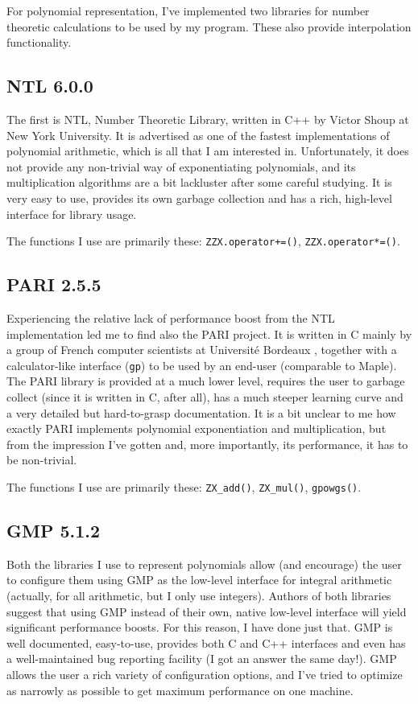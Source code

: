 \documentclass[a4paper, titlepage]{article}
\newcommand{\code}{\texttt}
\begin{document}
For polynomial representation, I've implemented two libraries for number theoretic calculations to be used by my program. These also provide interpolation functionality.

\subsection{NTL 6.0.0}
The first is NTL, Number Theoretic Library, written in C++ by Victor Shoup at New York University\cite{ntl}. It is advertised as one of the fastest implementations of polynomial arithmetic, which is all that I am interested in. Unfortunately, it does not provide any non-trivial way of exponentiating polynomials, and its multiplication algorithms are a bit lackluster after some careful studying. It is very easy to use, provides its own garbage collection and has a rich, high-level interface for library usage.

The functions I use are primarily these: \code{ZZX.operator+=()}, \code{ZZX.operator*=()}.

\subsection{PARI 2.5.5}
Experiencing the relative lack of performance boost from the NTL implementation led me to find also the PARI project. It is written in C mainly by a group of French computer scientists at Université Bordeaux \cite{pari}, together with a calculator-like interface (\code{gp}) to be used by an end-user (comparable to Maple). The PARI library is provided at a much lower level, requires the user to garbage collect (since it is written in C, after all), has a much steeper learning curve and a very detailed but hard-to-grasp documentation. It is a bit unclear to me how exactly PARI implements polynomial exponentiation and multiplication, but from the impression I've gotten and, more importantly, its performance, it has to be non-trivial.

The functions I use are primarily these: \code{ZX\_add()}, \code{ZX\_mul()}, \code{gpowgs()}.

\subsection{GMP 5.1.2}
Both the libraries I use to represent polynomials allow (and encourage) the user to configure them using GMP\cite{gmp} as the low-level interface for integral arithmetic (actually, for all arithmetic, but I only use integers). Authors of both libraries suggest that using GMP instead of their own, native low-level interface will yield significant performance boosts. For this reason, I have done just that. GMP is well documented, easy-to-use, provides both C and C++ interfaces and even has a well-maintained bug reporting facility (I got an answer the same day!). GMP allows the user a rich variety of configuration options, and I've tried to optimize as narrowly as possible to get maximum performance on one machine.
\end{document}
